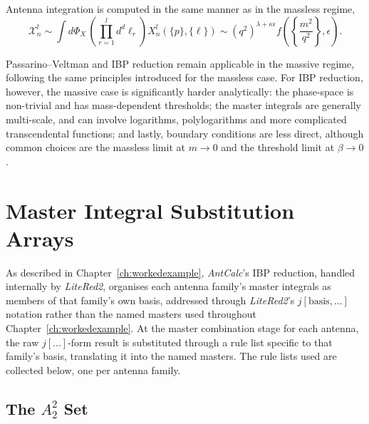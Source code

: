 Antenna integration is computed in the same manner as in the massless regime,
\begin{equation}
    \mathcal X_n^l\sim\int d\Phi_X\,\left(\prod_{r=1}^l d^d\ell_r\right)X_n^l(\{p\},\{\ell\})\sim\left(q^2\right)^{\lambda+\kappa\epsilon}f\!\left(\left\{\frac{m^2}{q^2}\right\},\epsilon\right).
\end{equation}

Passarino--Veltman and IBP reduction remain applicable in the massive regime, following the same
principles introduced for the massless case.
For IBP reduction, however, the massive case is significantly harder analytically:
the phase-space is non-trivial and has mass-dependent thresholds; the master
integrals are generally multi-scale, and can involve
logarithms, polylogarithms and more complicated transcendental functions;
and lastly, boundary conditions are less direct, although common choices are
the massless limit at $m\to0$ and the threshold limit at $\beta\to0$ \cite{GehrmannDeRidder:2009fz}.

\section{Master Integral Substitution Arrays}\label{sec:MISubsArrays}

As described in Chapter~\ref{ch:workedexample}, \textit{AntCalc}'s IBP reduction,
handled internally by \textit{LiteRed2}, organises each antenna family's master
integrals as members of that family's own basis, addressed through \textit{LiteRed2}'s
$j[\text{basis},...]$ notation rather than the named masters used throughout
Chapter~\ref{ch:workedexample}. At the master combination stage for each antenna, the
raw $j[...]$-form result is substituted through a rule list specific to that family's
basis, translating it into the named masters. The rule lists used are collected below,
one per antenna family.

\subsection{The $A_2^2$ Set}

